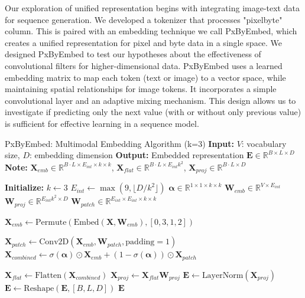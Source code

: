 \documentclass[10pt,a4paper]{article}
\begin{document}
Our exploration of unified representation begins with integrating image-text data for sequence generation. We developed a tokenizer that processes "pixelbyte" column. This is paired with an embedding technique we call PxByEmbed, which creates a unified representation for pixel and byte data in a single space. We designed PxByEmbed to test our hypotheses about the effectiveness of convolutional filters for higher-dimensional data. PxByEmbed uses a learned embedding matrix to map each token (text or image) to a vector space, while maintaining spatial relationships for image tokens. It incorporates a simple convolutional layer and an adaptive mixing mechanism. This design allows us to investigate if predicting only the next value (with or without only previous value) is sufficient for effective learning in a sequence model.


\begin{algorithm}[ht]
\footnotesize
\caption{PxByEmbed: Multimodal Embedding Algorithm (k=3)
\newline
\textbf{Input:} $V$: vocabulary size, $D$: embedding dimension
\newline
\textbf{Output:} Embedded representation $\mathbf{E} \in \mathbb{R}^{B \times L \times D}$
\newline
\textbf{Note:} $\mathbf{X}_{emb} \in \mathbb{R}^{B \cdot L \times E_{int} \times k \times k}$, 
$\mathbf{X}_{flat} \in \mathbb{R}^{B \cdot L \times E_{int}k^2}$, 
$\mathbf{X}_{proj} \in \mathbb{R}^{B \cdot L \times D}$
}
\begin{algorithmic}[0]
\State \textbf{Initialize:}
\State $k \gets 3$
\State $E_{int} \gets \max(9, \lfloor D / k^2 \rfloor)$
\State $\mathbf{\alpha} \in \mathbb{R}^{1 \times 1 \times k \times k}$ 
\State $\mathbf{W}_{emb} \in \mathbb{R}^{V \times E_{int}}$ 
\State $\mathbf{W}_{proj} \in \mathbb{R}^{E_{int}k^2 \times D}$ 
\State $\mathbf{W}_{patch} \in \mathbb{R}^{E_{int} \times E_{int} \times k \times k}$ 

    \State $\mathbf{X}_{emb} \gets \text{Permute}(\text{Embed}(\mathbf{X}, \mathbf{W}_{emb}), [0, 3, 1, 2])$ 
    
    \State $\mathbf{X}_{patch} \gets \text{Conv2D}(\mathbf{X}_{emb}, \mathbf{W}_{patch}, \text{padding}=1)$
    \State $\mathbf{X}_{combined} \gets \sigma(\mathbf{\alpha}) \odot \mathbf{X}_{emb} + (1 - \sigma(\mathbf{\alpha})) \odot \mathbf{X}_{patch}$
    
    \State $\mathbf{X}_{flat} \gets \text{Flatten}(\mathbf{X}_{combined})$ 
    \State $\mathbf{X}_{proj} \gets \mathbf{X}_{flat}\mathbf{W}_{proj}$ 
    \State $\mathbf{E} \gets \text{LayerNorm}(\mathbf{X}_{proj})$
    \State $\mathbf{E} \gets \text{Reshape}(\mathbf{E}, [B, L, D])$
    \State \Return $\mathbf{E}$
\EndFunction
\end{algorithmic}
\end{algorithm}
\end{document}
